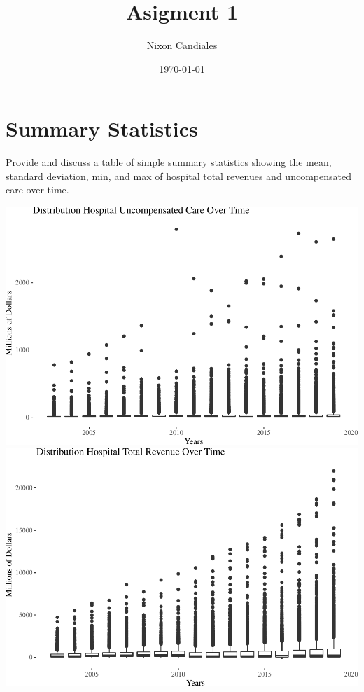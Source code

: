 \documentclass[
  12pt,
]{article}
\title{Asigment 1}
\author{Nixon Candiales}
\date{\today}
\begin{document}
\maketitle

\hypertarget{summary-statistics}{%
\section{Summary Statistics}\label{summary-statistics}}

Provide and discuss a table of simple summary statistics showing the
mean, standard deviation, min, and max of hospital total revenues and
uncompensated care over time.

\includegraphics{Report_files/figure-latex/Fig-1-1.pdf}
\includegraphics{Report_files/figure-latex/Fig-1-2.pdf}
\end{document}
